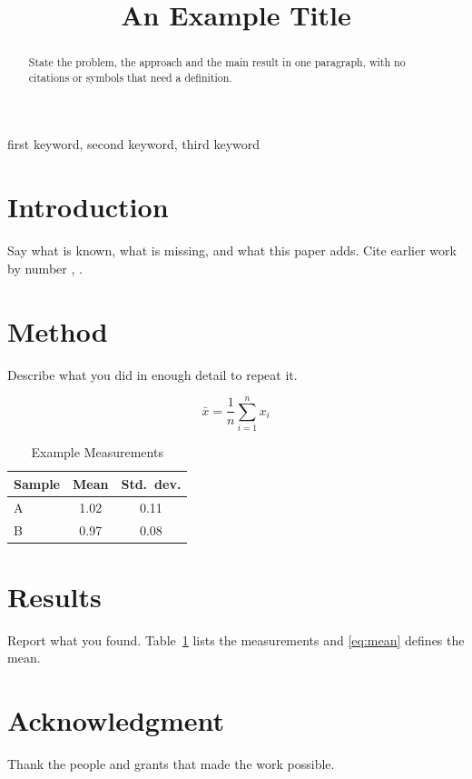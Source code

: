 \documentclass[conference]{IEEEtran}
\begin{document}
\title{An Example Title}

\author{
\and
{}
}

\maketitle

\begin{abstract}
State the problem, the approach and the main result in one paragraph, with no
citations or symbols that need a definition.
\end{abstract}

\begin{IEEEkeywords}
first keyword, second keyword, third keyword
\end{IEEEkeywords}

\section{Introduction}

Say what is known, what is missing, and what this paper adds. Cite earlier
work by number \cite{einstein1905}, \cite{knuth1984}.

\section{Method}

Describe what you did in enough detail to repeat it.

\begin{equation}
  \bar{x} = \frac{1}{n} \sum_{i=1}^{n} x_i
  \label{eq:mean}
\end{equation}

\begin{table}[htbp]
  \caption{Example Measurements}
  \label{tab:results}
  \centering
  \begin{tabular}{|l|c|c|}
    \hline
    Sample & Mean & Std.\ dev. \\
    \hline
    A & 1.02 & 0.11 \\
    B & 0.97 & 0.08 \\
    \hline
  \end{tabular}
\end{table}

\section{Results}

Report what you found. Table~\ref{tab:results} lists the measurements and
\eqref{eq:mean} defines the mean.

\section*{Acknowledgment}

Thank the people and grants that made the work possible.



\end{document}
